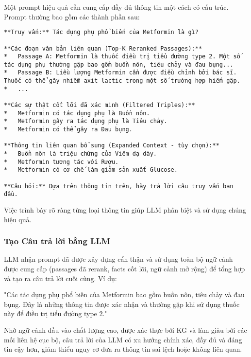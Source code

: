 \documentclass[../main.tex]{subfiles}
\begin{document}
Một prompt hiệu quả cần cung cấp đầy đủ thông tin một cách có cấu trúc. Prompt thường bao gồm các thành phần sau:

\begin{verbatim}
**Truy vấn:** Tác dụng phụ phổ biến của Metformin là gì?

**Các đoạn văn bản liên quan (Top-K Reranked Passages):**
*   Passage A: Metformin là thuốc điều trị tiểu đường type 2. Một số tác dụng phụ thường gặp bao gồm buồn nôn, tiêu chảy và đau bụng...
*   Passage B: Liều lượng Metformin cần được điều chỉnh bởi bác sĩ. Thuốc có thể gây nhiễm axit lactic trong một số trường hợp hiếm gặp.
*   ...

**Các sự thật cốt lõi đã xác minh (Filtered Triples):**
*   Metformin có tác dụng phụ là Buồn nôn.
*   Metformin gây ra tác dụng phụ là Tiêu chảy.
*   Metformin có thể gây ra Đau bụng.

**Thông tin liên quan bổ sung (Expanded Context - tùy chọn):**
*   Buồn nôn là triệu chứng của Viêm dạ dày.
*   Metformin tương tác với Rượu.
*   Metformin có cơ chế làm giảm sản xuất Glucose.

**Câu hỏi:** Dựa trên thông tin trên, hãy trả lời câu truy vấn ban đầu.
\end{verbatim}

Việc trình bày rõ ràng từng loại thông tin giúp LLM phân biệt và sử dụng chúng hiệu quả.

\subsubsection{Tạo Câu trả lời bằng LLM}

LLM nhận prompt đã được xây dựng cẩn thận và sử dụng toàn bộ ngữ cảnh được cung cấp (passages đã rerank, facts cốt lõi, ngữ cảnh mở rộng) để tổng hợp và tạo ra câu trả lời cuối cùng. Ví dụ:

"Các tác dụng phụ phổ biến của Metformin bao gồm buồn nôn, tiêu chảy và đau bụng. Đây là những thông tin được xác nhận và thường gặp khi sử dụng thuốc này để điều trị tiểu đường type 2."

Nhờ ngữ cảnh đầu vào chất lượng cao, được xác thực bởi KG và làm giàu bởi các mối liên hệ cục bộ, câu trả lời của LLM có xu hướng chính xác, đầy đủ và đáng tin cậy hơn, giảm thiểu nguy cơ đưa ra thông tin sai lệch hoặc không liên quan.
\end{document}
